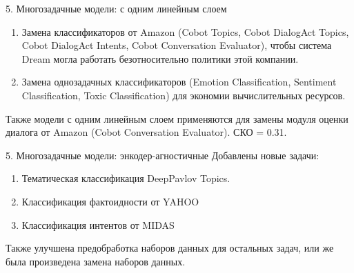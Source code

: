 \begin{frame}{5. Многозадачные модели: с одним линейным слоем}
\begin{enumerate}
\item Замена классификаторов от Amazon (Cobot Topics, Cobot DialogAct Topics, Cobot DialogAct Intents, Cobot Conversation Evaluator), чтобы система Dream могла работать безотносительно политики этой компании.
\item Замена однозадачных классификаторов (Emotion Classification, Sentiment Classification, Toxic Classification) для экономии вычислительных ресурсов.
\end{enumerate}
\begin{table}[htbp]
\caption{Точность на различных задачах для разных типов однозадачных моделей, в сравнении с многозадачными. }
\end{table}
\scriptsize Также модели с одним линейным слоем применяются для замены модуля оценки диалога от Amazon (Cobot Conversation Evaluator). СКО = 0.31.

\end{frame}


\begin{frame}{5. Многозадачные модели: энкодер-агностичные}
Добавлены новые задачи: 
\begin{enumerate}
    \item Тематическая классификация DeepPavlov Topics.
    \item Классификация фактоидности от YAHOO
    \item Классификация интентов от MIDAS
\end{enumerate}
 Также улучшена предобработка наборов данных для остальных задач, или же была произведена замена наборов данных.
\end{frame}


